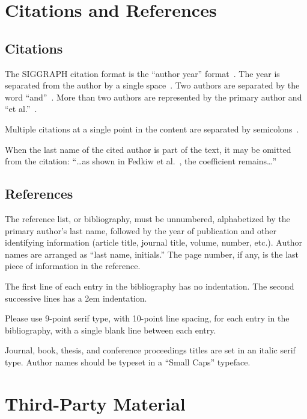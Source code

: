 \documentclass[tog]{acmsiggraph}
\begin{document}
\section{Citations and References}

\subsection{Citations}

The SIGGRAPH citation format is the ``author year''
format~\cite{Pellacini:2005:LAH}. The year is separated from the
author by a single space~\cite{yee:2000:ssa}. Two authors are
separated by the word ``and''~\cite{parke:1996:CFA}. More than two
authors are represented by the primary author and ``et al.''~\cite{levoy:2000:TDM}.

Multiple citations at a single point in the content are separated by
semicolons~\cite{levoy:2000:TDM,sako:2001:SSB}.

When the last name of the cited author is part of the text, it may be
omitted from the citation: ``\ldots as shown in Fedkiw et
al.~, the coefficient remains\ldots''

\subsection{References}

The reference list, or bibliography, must be unnumbered, alphabetized
by the primary author's last name, followed by the year of publication
and other identifying information (article title, journal title,
volume, number, etc.). Author names are arranged as ``last name,
initials.'' The page number, if any, is the last piece of information
in the reference.

The first line of each entry in the bibliography has no
indentation. The second successive lines has a 2em
indentation. 

Please use 9-point serif type, with 10-point line spacing, for each
entry in the bibliography, with a single blank line between each
entry. 

Journal, book, thesis, and conference proceedings titles are set in an
italic serif type. {\sc Author names should be typeset in a ``Small
Caps'' typeface.}

\section{Third-Party Material}
\end{document}
